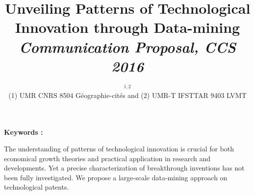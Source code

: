 


\title{Unveiling Patterns of Technological Innovation through Data-mining\\\bigskip
\textit{Communication Proposal, CCS 2016}
}
\author{\small{}$^{1,2}$\\
\small(1) UMR CNRS 8504 Géographie-cités and (2) UMR-T IFSTTAR 9403 LVMT
}
\date{}

\maketitle

\justify


\textbf{Keywords : }\textit{}

The understanding of patterns of technological innovation is crucial for both economical growth theories and practical application in research and developments. Yet a precise characterization of breakthrough inventions has not been fully investigated. We propose a large-scale data-mining approach on technological patents.

\bigskip


\bigskip







%
%




